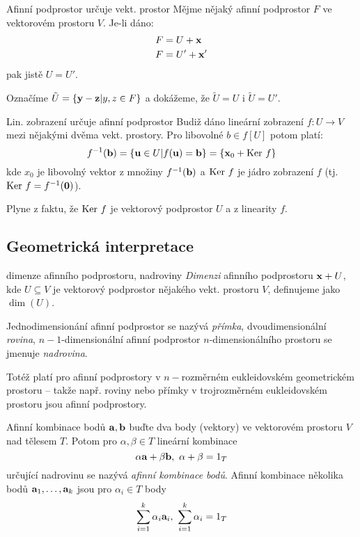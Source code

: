 \begin{vetaN}{Afinní podprostor určuje vekt. prostor}
Mějme nějaký afinní podprostor $F$ ve vektorovém prostoru $V$. Je-li dáno:
\begin{align*}
    F &= U + \mathbf{x} \\
    F &= U' + \mathbf{x'}
\end{align*}
pak jistě $U=U'$.

\begin{dukaz}
Označíme $\tilde{U}=\{\mathbf{y}-\mathbf{z}|y,z\in F\}$ a dokážeme, že $\tilde{U}=U$ i $\tilde{U}=U'$.
\end{dukaz} 
\end{vetaN}

\begin{vetaN}{Lin. zobrazení určuje afinní podprostor}
Budiž dáno lineární zobrazení $f:U\to V$ mezi nějakými dvěma vekt. prostory. Pro libovolné $b\in f[U]$ potom platí:
$$f^{-1}(\mathbf{b})=\{\mathbf{u}\in U|f(\mathbf{u})=\mathbf{b}\}=\{\mathbf{x}_0 + \mathrm{Ker\ } f\}$$
kde $x_0$ je libovolný vektor z množiny $f^{-1}(\mathbf{b})$ a $\mathrm{Ker\ } f$ je jádro zobrazení $f$ (tj. $\mathrm{Ker\ } f=f^{-1}(\mathbf{0})$).

\begin{dukaz}
Plyne z faktu, že $\mathrm{Ker\ } f$ je vektorový podprostor $U$ a z linearity $f$.
\end{dukaz}
\end{vetaN}

\subsection{Geometrická interpretace}

\begin{definiceN}{dimenze afinního podprostoru, nadroviny}
\emph{Dimenzi} afinního podprostoru $\mathbf{x}+U$, kde $U\subseteq V$ je vektorový podprostor nějakého vekt. prostoru $V$, definujeme jako $\dim(U)$. 

Jednodimensionání afinní podprostor se nazývá \emph{přímka}, dvoudimensionální \emph{rovina}, $n-1$-dimensionální afinní podprostor $n$-dimensionálního prostoru se jmenuje \emph{nadrovina}.
\end{definiceN}

\begin{poznamka}
Totéž platí pro afinní podprostory v $n-$rozměrném eukleidovském geometrickém prostoru -- takže např. roviny nebo přímky v trojrozměrném eukleidovském prostoru jsou afinní podprostory.
\end{poznamka}

\begin{definiceN}{Afinní kombinace bodů}
$\mathbf{a},\mathbf{b}$ buďte dva body (vektory) ve vektorovém prostoru $V$ nad tělesem $T$. Potom pro $\alpha,\beta\in T$ lineární kombinace
$$\alpha\b{a}+\beta\b{b},\ \alpha+\beta=1_T$$
určující nadrovinu se nazývá \emph{afinní kombinace bodů}. Afinní kombinace několika bodů $\mathbf{a}_1,\dots,\mathbf{a}_k$ jsou pro $\alpha_i\in T$ body 
$$\sum_{i=1}^k\alpha_i\b{a}_i,\ \sum_{i=1}^k\alpha_i=1_T$$
\end{definiceN}

